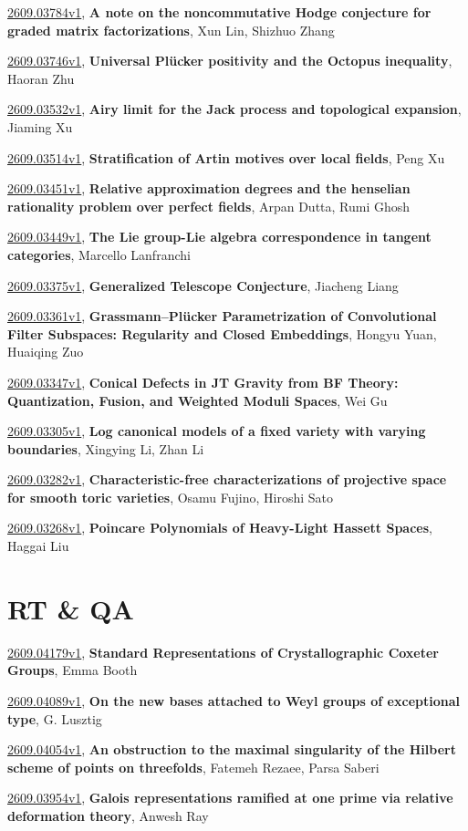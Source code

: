 \documentclass[9pt, a4paper]{article}
\theoremstyle{plain}
\theoremstyle{definition}
\theoremstyle{remark}
\newcommand{\arxiv}[3]{\href{https://arxiv.org/abs/#1}{#1}, \textbf{\textcolor{arxivblue}{#2}}, #3}
\begin{document}
\arxiv{2609.03784v1}{A note on the noncommutative Hodge conjecture for graded matrix factorizations}{Xun Lin, Shizhuo Zhang}

\arxiv{2609.03746v1}{Universal Plücker positivity and the Octopus inequality}{Haoran Zhu}

\arxiv{2609.03532v1}{Airy limit for the Jack process and topological expansion}{Jiaming Xu}

\arxiv{2609.03514v1}{Stratification of Artin motives over local fields}{Peng Xu}

\arxiv{2609.03451v1}{Relative approximation degrees and the henselian rationality problem over perfect fields}{Arpan Dutta, Rumi Ghosh}

\arxiv{2609.03449v1}{The Lie group-Lie algebra correspondence in tangent categories}{Marcello Lanfranchi}

\arxiv{2609.03375v1}{Generalized Telescope Conjecture}{Jiacheng Liang}

\arxiv{2609.03361v1}{Grassmann--Plücker Parametrization of Convolutional Filter Subspaces: Regularity and Closed Embeddings}{Hongyu Yuan, Huaiqing Zuo}

\arxiv{2609.03347v1}{Conical Defects in JT Gravity from BF Theory: Quantization, Fusion, and Weighted Moduli Spaces}{Wei Gu}

\arxiv{2609.03305v1}{Log canonical models of a fixed variety with varying boundaries}{Xingying Li, Zhan Li}

\arxiv{2609.03282v1}{Characteristic-free characterizations of projective space for smooth toric varieties}{Osamu Fujino, Hiroshi Sato}

\arxiv{2609.03268v1}{Poincare Polynomials of Heavy-Light Hassett Spaces}{Haggai Liu}


\section{RT \& QA}
\arxiv{2609.04179v1}{Standard Representations of Crystallographic Coxeter Groups}{Emma Booth}

\arxiv{2609.04089v1}{On the new bases attached to Weyl groups of exceptional type}{G. Lusztig}

\arxiv{2609.04054v1}{An obstruction to the maximal singularity of the Hilbert scheme of points on threefolds}{Fatemeh Rezaee, Parsa Saberi}

\arxiv{2609.03954v1}{Galois representations ramified at one prime via relative deformation theory}{Anwesh Ray}
\end{document}
